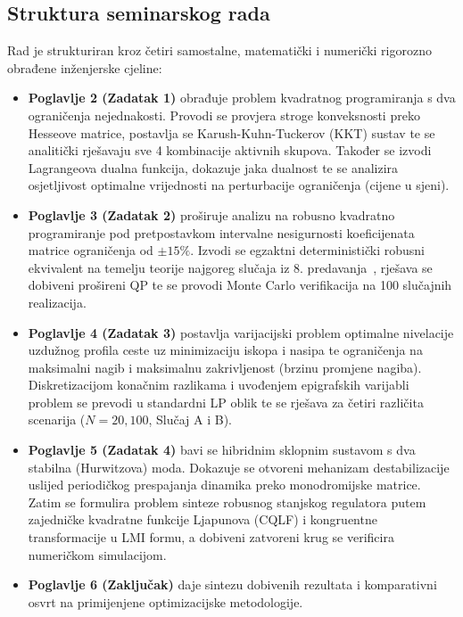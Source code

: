 \subsection{Struktura seminarskog rada}

Rad je strukturiran kroz četiri samostalne, matematički i numerički rigorozno obrađene inženjerske cjeline:
\begin{itemize}
    \item \textbf{Poglavlje 2 (Zadatak 1)} obrađuje problem kvadratnog programiranja s dva ograničenja nejednakosti. Provodi se provjera stroge konveksnosti preko Hesseove matrice, postavlja se Karush-Kuhn-Tuckerov (KKT) sustav te se analitički rješavaju sve 4 kombinacije aktivnih skupova. Također se izvodi Lagrangeova dualna funkcija, dokazuje jaka dualnost te se analizira osjetljivost optimalne vrijednosti na perturbacije ograničenja (cijene u sjeni).
    \item \textbf{Poglavlje 3 (Zadatak 2)} proširuje analizu na robusno kvadratno programiranje pod pretpostavkom intervalne nesigurnosti koeficijenata matrice ograničenja od $\pm 15\%$. Izvodi se egzaktni deterministički robusni ekvivalent na temelju teorije najgoreg slučaja iz 8. predavanja~\cite{jokic2024predavanja}, rješava se dobiveni prošireni QP te se provodi Monte Carlo verifikacija na 100 slučajnih realizacija.
    \item \textbf{Poglavlje 4 (Zadatak 3)} postavlja varijacijski problem optimalne nivelacije uzdužnog profila ceste uz minimizaciju iskopa i nasipa te ograničenja na maksimalni nagib i maksimalnu zakrivljenost (brzinu promjene nagiba). Diskretizacijom konačnim razlikama i uvođenjem epigrafskih varijabli problem se prevodi u standardni LP oblik te se rješava za četiri različita scenarija ($N=20, 100$, Slučaj A i B).
    \item \textbf{Poglavlje 5 (Zadatak 4)} bavi se hibridnim sklopnim sustavom s dva stabilna (Hurwitzova) moda. Dokazuje se otvoreni mehanizam destabilizacije uslijed periodičkog prespajanja dinamika preko monodromijske matrice. Zatim se formulira problem sinteze robusnog stanjskog regulatora putem zajedničke kvadratne funkcije Ljapunova (CQLF) i kongruentne transformacije u LMI formu, a dobiveni zatvoreni krug se verificira numeričkom simulacijom.
    \item \textbf{Poglavlje 6 (Zaključak)} daje sintezu dobivenih rezultata i komparativni osvrt na primijenjene optimizacijske metodologije.
\end{itemize}
